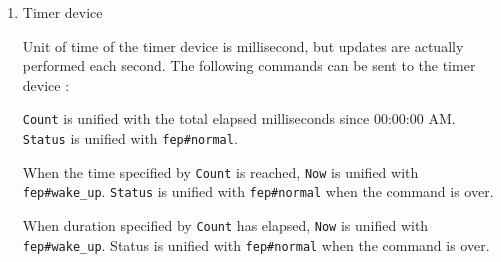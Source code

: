 \begin{enumerate}
\begin{itemize}
Opens directory with path name \verb|PathName| (8 bits string) and
unifies \verb|DirectoryStream| with its command stream.  When
open is successful, \verb|Status| is unified with \verb|fep#normal|.
When it fails, \verb|Status| is unified with
\verb|fep#abnormal|.  Commands can be inserted in a
directory stream which has been successfully created
(reset/4 is also requisite
for directory.). A directory is automatically closed when its
stream is closed.

\end{itemize}
\item Timer device 

Unit of time of the timer device is millisecond, but updates are actually
performed each second. The following commands can be sent to the timer
device :
\begin{itemize}

\verb|Count| is unified with the total elapsed milliseconds since 00:00:00
AM. \verb|Status| is unified with \verb|fep#normal|.

When the time specified by \verb|Count| is reached, \verb|Now| is unified with
\verb|fep#wake_up|.  \verb|Status| is unified with \verb|fep#normal|
when the command is over.

When duration specified by \verb|Count| has elapsed, \verb|Now| is unified with
\verb|fep#wake_up|. Status is unified with \verb|fep#normal|
when the command is over.

\end{itemize}
\end{enumerate}
\vspace{1ex}

